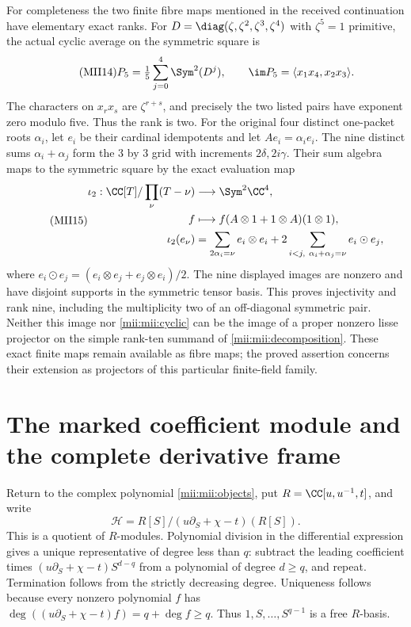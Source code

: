 For completeness the two finite fibre maps mentioned in the received
continuation have elementary exact ranks. For
$D=\diag(\zeta,\zeta^2,\zeta^3,\zeta^4)$ with $\zeta^5=1$ primitive,
the actual cyclic average on the symmetric square is
\begin{equation}\tag{MII14}\label{mii:mii:cyclic}
 P_5=\tfrac15\sum_{j=0}^4\Sym^2(D^j),\qquad
 \im P_5=\langle x_1x_4,x_2x_3\rangle.
\end{equation}
The characters on $x_rx_s$ are $\zeta^{r+s}$, and precisely the
two listed pairs have exponent zero modulo five. Thus the rank is
two. For the original four distinct one-packet roots $\alpha_i$,
let $e_i$ be their cardinal idempotents and let $A e_i=\alpha_i e_i$.
The nine distinct sums $\alpha_i+\alpha_j$ form the $3$ by $3$
grid with increments $2\delta,2i\gamma$. Their sum algebra maps to
the symmetric square by the exact evaluation map
\begin{equation}\tag{MII15}\label{mii:mii:sumembedding}
 \begin{aligned}
 \iota_2:\CC[T]/\prod_{\nu}(T-\nu)&\longrightarrow\Sym^2\CC^4,\\
 f&\longmapsto f(A\otimes1+1\otimes A)(1\otimes1),\\
 \iota_2(e_\nu)&=
 \sum_{2\alpha_i=\nu}e_i\otimes e_i
 +2\sum_{i<j,\ \alpha_i+\alpha_j=\nu}e_i\odot e_j,
 \end{aligned}
\end{equation}
where $e_i\odot e_j=(e_i\otimes e_j+e_j\otimes e_i)/2$.
The nine displayed images are nonzero and have disjoint supports in
the symmetric tensor basis. This proves injectivity and rank nine,
including the multiplicity two of an off-diagonal symmetric pair.
Neither this image nor \eqref{mii:mii:cyclic} can be the image of a
proper nonzero lisse projector on the simple rank-ten summand of
\eqref{mii:mii:decomposition}. These exact finite maps remain available
as fibre maps; the proved assertion concerns their extension as
projectors of this particular finite-field family.

\section{The marked coefficient module and the complete derivative frame}
Return to the complex polynomial \eqref{mii:mii:objects}, put
$R=\CC[u,u^{-1},t]$, and write
\[
 \mathscr H=R[S]/(u\partial_S+\chi-t)(R[S]).
\]
This is a quotient of $R$-modules. Polynomial division in the
differential expression gives a unique representative of degree less
than $q$: subtract the leading coefficient times
$(u\partial_S+\chi-t)S^{d-q}$ from a polynomial of degree $d\ge q$,
and repeat. Termination follows from the strictly decreasing degree.
Uniqueness follows because every nonzero polynomial $f$ has
$\deg((u\partial_S+\chi-t)f)=q+\deg f\ge q$.
Thus $1,S,\ldots,S^{q-1}$ is a free $R$-basis.

